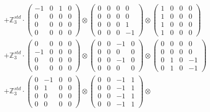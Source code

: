 \documentclass{article}
\begin{document}
{\begin{align}
        &+ \label{Rs1-Rc16-Solution-5-c12} \mathbb{Z}_3^{std} \cdot 
            \begin{pmatrix} -1 & 0 & 1 & 0 \\ 0 & 0 & 0 & 0 \\ 0 & 0 & 0 & 0 \\ 0 & 0 & 0 & 0 \end{pmatrix} \otimes 
            \begin{pmatrix} 0 & 0 & 0 & 0 \\ 0 & 0 & 0 & 0 \\ 0 & 0 & 0 & 1 \\ 0 & 0 & 0 & -1 \end{pmatrix} \otimes 
            \begin{pmatrix} 1 & 0 & 0 & 0 \\ 1 & 0 & 0 & 0 \\ 1 & 0 & 0 & 0 \\ 1 & 0 & 0 & 0 \end{pmatrix} \\ 
        &+ \label{Rs1-Rc16-Solution-5-c13} \mathbb{Z}_3^{std} \cdot 
            \begin{pmatrix} 0 & 0 & 0 & 0 \\ -1 & 0 & 0 & 0 \\ 0 & 0 & 0 & 0 \\ 0 & 0 & 0 & 0 \end{pmatrix} \otimes 
            \begin{pmatrix} 0 & 0 & -1 & 0 \\ 0 & 0 & 0 & 0 \\ 0 & 0 & -1 & 0 \\ 0 & 0 & 0 & 0 \end{pmatrix} \otimes 
            \begin{pmatrix} 0 & 0 & 0 & 0 \\ 0 & 0 & 0 & 0 \\ 0 & 1 & 0 & -1 \\ 0 & 1 & 0 & -1 \end{pmatrix} \\ 
        &+ \label{Rs1-Rc16-Solution-5-c14} \mathbb{Z}_3^{std} \cdot 
            \begin{pmatrix} 0 & -1 & 0 & 0 \\ 0 & 1 & 0 & 0 \\ 0 & 0 & 0 & 0 \\ 0 & 0 & 0 & 0 \end{pmatrix} \otimes 
            \begin{pmatrix} 0 & 0 & -1 & 1 \\ 0 & 0 & -1 & 1 \\ 0 & 0 & -1 & 1 \\ 0 & 0 & -1 & 1 \end{pmatrix} \otimes 

\end{align}}
\end{document}
